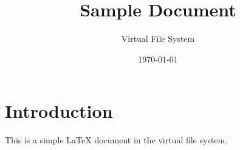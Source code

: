 \documentclass{article}
\title{Sample Document}
\author{Virtual File System}
\date{\today}
\begin{document}
\maketitle

\section{Introduction}
This is a simple LaTeX document in the virtual file system.
\end{document}
